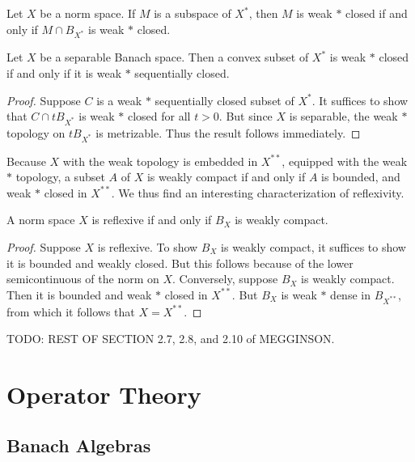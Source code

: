 \begin{corollary}
    Let $X$ be a norm space. If $M$ is a subspace of $X^*$, then $M$ is weak $*$ closed if and only if $M \cap B_{X^*}$ is weak $*$ closed.
\end{corollary}

\begin{corollary}
    Let $X$ be a separable Banach space. Then a convex subset of $X^*$ is weak $*$ closed if and only if it is weak $*$ sequentially closed.
\end{corollary}
\begin{proof}
    Suppose $C$ is a weak $*$ sequentially closed subset of $X^*$. It suffices to show that $C \cap t B_{X^*}$ is weak $*$ closed for all $t > 0$. But since $X$ is separable, the weak $*$ topology on $t B_{X^*}$ is metrizable. Thus the result follows immediately.
\end{proof}

Because $X$ with the weak topology is embedded in $X^{**}$, equipped with the weak $*$ topology, a subset $A$ of $X$ is weakly compact if and only if $A$ is bounded, and weak $*$ closed in $X^{**}$. We thus find an interesting characterization of reflexivity.

\begin{theorem}
    A norm space $X$ is reflexive if and only if $B_X$ is weakly compact.
\end{theorem}
\begin{proof}
    Suppose $X$ is reflexive. To show $B_X$ is weakly compact, it suffices to show it is bounded and weakly closed. But this follows because of the lower semicontinuous of the norm on $X$. Conversely, suppose $B_X$ is weakly compact. Then it is bounded and weak $*$ closed in $X^{**}$. But $B_X$ is weak $*$ dense in $B_{X^{**}}$, from which it follows that $X = X^{**}$.
\end{proof}

TODO: REST OF SECTION 2.7, 2.8, and 2.10 of MEGGINSON.








\part{Operator Theory}





\chapter{Banach Algebras}

